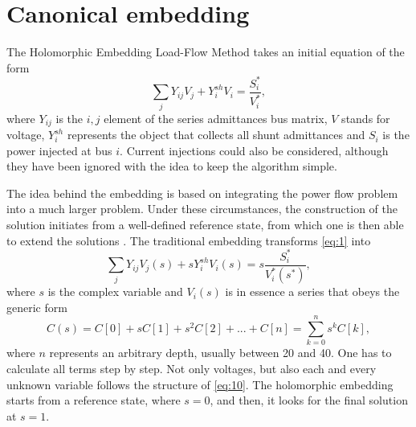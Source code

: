 \documentclass[journal]{IEEEtran}
\begin{document}



\section{Canonical embedding} \label{sec1}
The Holomorphic Embedding Load-Flow Method takes an initial equation of the form
\begin{equation}
  \sum_{j} Y_{ij}V_j + Y_i^{sh}V_i=\frac{S^*_i}{V^*_i},\label{eq:1}
\end{equation}
where $Y_{ij}$ is the $i,j$ element of the series admittances bus matrix, $V$ stands for voltage, $Y^{sh}_i$ represents the object that collects all shunt admittances and $S_i$ is the power injected at bus $i$. Current injections could also be considered, although they have been ignored with the idea to keep the algorithm simple.  

The idea behind the embedding is based on integrating the power flow problem into a much larger problem. Under these circumstances, the construction of the solution initiates from a well-defined reference state, from which one is then able to extend the solutions \cite{Trias2018}. The traditional embedding transforms \eqref{eq:1} into
\begin{equation}
   \sum_{j} Y_{ij}V_j(s) + sY_i^{sh}V_i(s)=s\frac{S^*_i}{V^*_i(s^*)},\label{eq:2}
\end{equation}
where $s$ is the complex variable and $V_i(s)$ is in essence a series that obeys the generic form
\begin{equation}
  C(s)=C[0]+sC[1]+s^2C[2]+...+C[n]=\sum_{k=0}^{n}s^kC[k],\label{eq:10}
\end{equation}
where $n$ represents an arbitrary depth, usually between 20 and 40. One has to calculate all terms step by step. Not only voltages, but also each and every unknown variable follows the structure of \eqref{eq:10}. The holomorphic embedding starts from a reference state, where $s=0$, and then, it looks for the final solution at $s=1$. 
\end{document}
